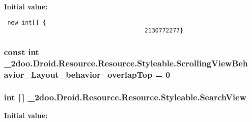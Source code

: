 \textbf{Initial value:}

\begin{Code}\begin{verbatim} new int[] {
                                        2130772277}
\end{verbatim}
\end{Code}
\hypertarget{class__2doo_1_1_droid_1_1_resource_1_1_styleable_1c79d9a0512a38dc65bb3b4802619676}{
\subsubsection[{ScrollingViewBehavior\_\-Layout\_\-behavior\_\-overlapTop}]{\setlength{\rightskip}{0pt plus 5cm}const int \_\-2doo.Droid.Resource.Resource.Styleable.ScrollingViewBehavior\_\-Layout\_\-behavior\_\-overlapTop = 0}}
\label{class__2doo_1_1_droid_1_1_resource_1_1_styleable_1c79d9a0512a38dc65bb3b4802619676}


\hypertarget{class__2doo_1_1_droid_1_1_resource_1_1_styleable_2f656b1eaea7ce48ed29f58fa9e8f12e}{
\subsubsection[{SearchView}]{\setlength{\rightskip}{0pt plus 5cm}int \mbox{[}$\,$\mbox{]} \_\-2doo.Droid.Resource.Resource.Styleable.SearchView}}
\label{class__2doo_1_1_droid_1_1_resource_1_1_styleable_2f656b1eaea7ce48ed29f58fa9e8f12e}


\textbf{Initial value:}

